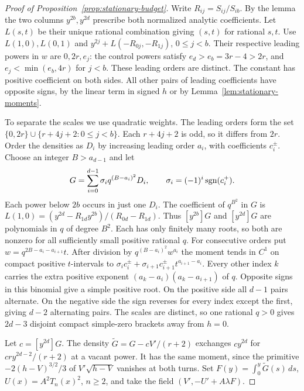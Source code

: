 \begin{proof}[Proof of Proposition~\ref{prop:stationary-budget}]
Write \(R_{ij}=S_{ij}/S_{ib}\). By the lemma the two columns \(y^{2b},y^{2d}\) prescribe both normalized analytic coefficients. Let \(L(s,t)\) be their unique rational combination giving \((s,t)\) for rational \(s,t\).
Use \(L(1,0),L(0,1)\) and \(y^{2j}+L(-R_{0j},-R_{1j})\), \(0\le j<b\).
Their respective leading powers in \(w\) are \(0,2r,e_j\): the control powers satisfy \(e_d>e_b=3r-4>2r\), and \(e_j<\min(e_b,4r)\) for \(j<b\). These leading orders are distinct. The constant has positive coefficient on both sides. All other pairs of leading coefficients have opposite signs, by the linear term in signed \(h\) or by Lemma~\ref{lem:stationary-moments}.

To separate the scales we use quadratic weights. The leading orders form the set \(\{0,2r\}\cup\{r+4j+2:0\le j<b\}\). Each \(r+4j+2\) is odd, so it differs from \(2r\). Order the densities as \(D_i\) by increasing leading order \(a_i\), with coefficients \(c_i^\pm\). Choose an integer \(B>a_{d-1}\) and let
\[
 G=\sum_{i=0}^{d-1}\sigma_i q^{(B-a_i)^2}D_i,\qquad
 \sigma_i=(-1)^i\operatorname{sgn}(c_i^+).
\]
Each power below \(2b\) occurs in just one \(D_i\).
The coefficient of \(q^{B^2}\) in \(G\) is \(L(1,0)=(y^{2d}-R_{1d}y^{2b})/(R_{0d}-R_{1d})\). Thus \([y^{2b}]G\) and \([y^{2d}]G\) are polynomials in \(q\) of degree \(B^2\). Each has only finitely many roots, so both are nonzero for all sufficiently small positive rational \(q\).
For consecutive orders put \(w=q^{2B-a_i-a_{i+1}}t\).
After division by \(q^{(B-a_i)^2} w^{a_i}\) the moment tends in \(C^1\) on compact positive \(t\)-intervals to
\(\sigma_i c_i^\pm+\sigma_{i+1}c_{i+1}^\pm t^{a_{i+1}-a_i}\).
Every other index \(k\) carries the extra positive exponent \((a_k-a_i)(a_k-a_{i+1})\) of \(q\).
Opposite signs in this binomial give a simple positive root. On the positive side all \(d-1\) pairs alternate. On the negative side the sign reverses for every index except the first, giving \(d-2\) alternating pairs. The scales are distinct, so one rational \(q>0\) gives \(2d-3\) disjoint compact simple-zero brackets away from \(h=0\).

Let \(c=[y^{2d}]G\). The density \(\widetilde G=G-cV'/(r+2)\) exchanges \(cy^{2d}\) for \(cr y^{2d-2}/(r+2)\) at a vacant power. It has the same moment, since the primitive \(-2(h-V)^{3/2}/3\) of \(V'\sqrt{h-V}\) vanishes at both turns. Set \(F(y)=\int_0^y\widetilde G(s)\,ds\), \(U(x)=A^2T_n(x)^2\), \(n\ge2\), and take the field \((V',-U'+A\lambda F)\).


\end{proof}
